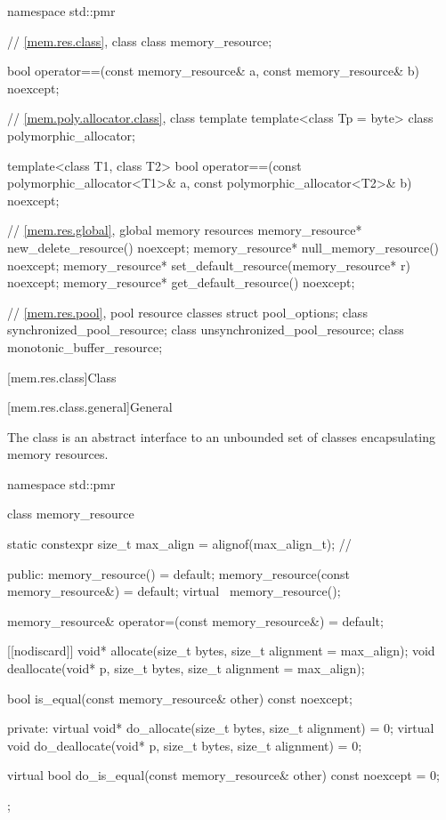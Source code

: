 %
\begin{codeblock}
namespace std::pmr {
  // \ref{mem.res.class}, class 
  class memory_resource;

  bool operator==(const memory_resource& a, const memory_resource& b) noexcept;

  // \ref{mem.poly.allocator.class}, class template 
  template<class Tp = byte> class polymorphic_allocator;

  template<class T1, class T2>
    bool operator==(const polymorphic_allocator<T1>& a,
                    const polymorphic_allocator<T2>& b) noexcept;

  // \ref{mem.res.global}, global memory resources
  memory_resource* new_delete_resource() noexcept;
  memory_resource* null_memory_resource() noexcept;
  memory_resource* set_default_resource(memory_resource* r) noexcept;
  memory_resource* get_default_resource() noexcept;

  // \ref{mem.res.pool}, pool resource classes
  struct pool_options;
  class synchronized_pool_resource;
  class unsynchronized_pool_resource;
  class monotonic_buffer_resource;
}
\end{codeblock}

[mem.res.class]{Class }

[mem.res.class.general]{General}

\pnum
The  class is an abstract interface to an unbounded set of classes encapsulating memory resources.

%
%
\begin{codeblock}
namespace std::pmr {
  class memory_resource {
    static constexpr size_t max_align = alignof(max_align_t);   // \expos

  public:
    memory_resource() = default;
    memory_resource(const memory_resource&) = default;
    virtual ~memory_resource();

    memory_resource& operator=(const memory_resource&) = default;

    [[nodiscard]] void* allocate(size_t bytes, size_t alignment = max_align);
    void deallocate(void* p, size_t bytes, size_t alignment = max_align);

    bool is_equal(const memory_resource& other) const noexcept;

  private:
    virtual void* do_allocate(size_t bytes, size_t alignment) = 0;
    virtual void do_deallocate(void* p, size_t bytes, size_t alignment) = 0;

    virtual bool do_is_equal(const memory_resource& other) const noexcept = 0;
  };
}
\end{codeblock}


